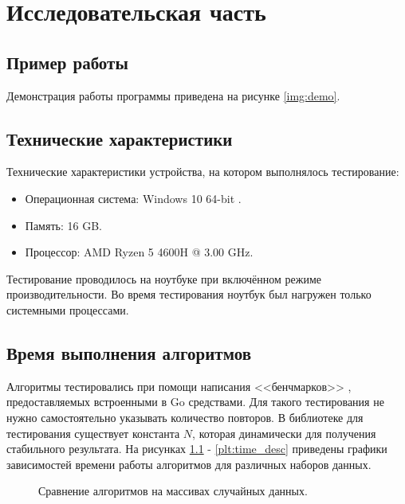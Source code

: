 \chapter{Исследовательская часть}

\section{Пример работы}

Демонстрация работы программы приведена на рисунке \ref{img:demo}.


\section{Технические характеристики}

Технические характеристики устройства, на котором выполнялось тестирование:

\begin{itemize}
	\item Операционная система: Windows 10 64-bit \cite{windows}.
	\item Память: 16 GB.
	\item Процессор: AMD Ryzen 5 4600H \cite{amd} @ 3.00 GHz.
\end{itemize}

Тестирование проводилось на ноутбуке при включённом режиме производительности. Во время тестирования ноутбук был нагружен только системными процессами.

\section{Время выполнения алгоритмов}

Алгоритмы тестировались при помощи написания <<бенчмарков>> \cite{gotest}, предоставляемых встроенными в Go средствами. Для такого  тестирования не нужно самостоятельно указывать количество повторов. В библиотеке для тестирования существует константа $N$, которая динамически для получения стабильного результата. На рисунках \ref{plt:time_rand} - \ref{plt:time_desc} приведены графики зависимостей времени работы алгоритмов для различных наборов данных.

\begin{figure}[!h]
	\centering
	\captionsetup{justification=centering}
	\caption{Сравнение алгоритмов на массивах случайных данных.}
	\label{plt:time_rand}
\end{figure}

